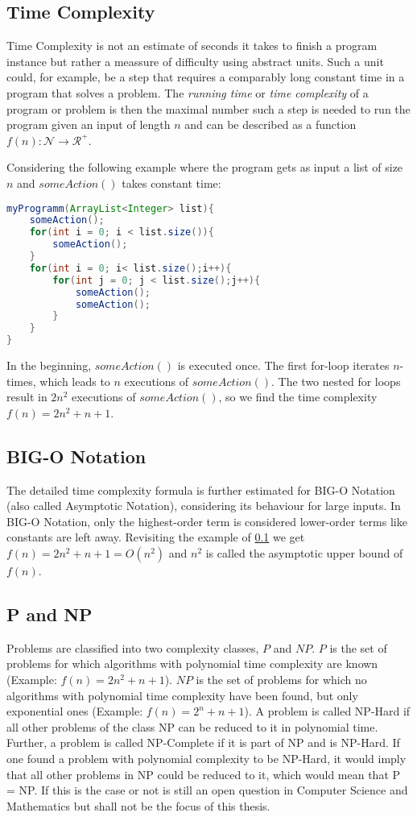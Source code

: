 \subsection{Time Complexity}\label{TimeComplexity}
Time Complexity is not an estimate of seconds it takes to finish a program instance but rather a meassure of difficulty using abstract units. Such a unit could, for example, be a step that requires a comparably long constant time in a program that solves a problem. The \emph{running time} or \emph{time complexity} of a program or problem is then the maximal number such a step is needed to run the program given an input of length $n$ and can be described as a function $f(n): \mathcal{N} \rightarrow \mathcal{R}^+$. 

Considering the following example where the program gets as input a list of size $n$ and $someAction()$ takes constant time:
\lstset{basicstyle=\ttfamily}
\begin{lstlisting}[language=java,frame=single]
myProgramm(ArrayList<Integer> list){
    someAction();
    for(int i = 0; i < list.size()){
        someAction();
    }
    for(int i = 0; i< list.size();i++){
        for(int j = 0; j < list.size();j++){
            someAction();
            someAction();
        }
    }
}
\end{lstlisting}
In the beginning, $someAction()$ is executed once. The first for-loop iterates $n$-times, which leads to $n$ executions of $someAction()$. The two nested for loops result in $2n^2$ executions of $someAction()$, so we find the time complexity $f(n)=2n^2+n+1$.

\subsection{BIG-O Notation}
The detailed time complexity formula is further estimated for BIG-O Notation (also called Asymptotic Notation), considering its behaviour for large inputs. In BIG-O Notation, only the highest-order term is considered lower-order terms like constants are left away. Revisiting the example of \ref{TimeComplexity} we get $f(n) = 2n^2+n+1 = O(n^2)$ and $n^2$ is called the asymptotic upper bound of $f(n)$.

\subsection{P and NP}
Problems are classified into two complexity classes, $P$ and $NP$. $P$ is the set of problems for which algorithms with polynomial time complexity are known (Example: $f(n)=2n^2+n+1$). $NP$ is the set of problems for which no algorithms with polynomial time complexity have been found, but only exponential ones (Example: $f(n)=2^n+n+1$). A problem is called NP-Hard if all other problems of the class NP can be reduced to it in polynomial time. Further, a problem is called NP-Complete if it is part of NP and is NP-Hard. If one found a problem with polynomial complexity to be NP-Hard, it would imply that all other problems in NP could be reduced to it, which would mean that P = NP. If this is the case or not is still an open question in Computer Science and Mathematics but shall not be the focus of this thesis.

